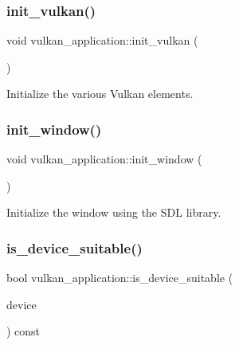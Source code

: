 \subsubsection{\texorpdfstring{init\+\_\+vulkan()}{init\_vulkan()}}
{\footnotesize\ttfamily void vulkan\+\_\+application\+::init\+\_\+vulkan (\begin{DoxyParamCaption}{ }\end{DoxyParamCaption})\hspace{0.3cm}{\ttfamily [private]}}



Initialize the various Vulkan elements. 

\mbox{\label{classvulkan__application_a6da121f1ee6104c981725c7c848c53a2}} 
\subsubsection{\texorpdfstring{init\+\_\+window()}{init\_window()}}
{\footnotesize\ttfamily void vulkan\+\_\+application\+::init\+\_\+window (\begin{DoxyParamCaption}{ }\end{DoxyParamCaption})\hspace{0.3cm}{\ttfamily [private]}}



Initialize the window using the S\+DL library. 

\mbox{\label{classvulkan__application_ae329db3c0937c649fa95b64250372a43}} 
\subsubsection{\texorpdfstring{is\+\_\+device\+\_\+suitable()}{is\_device\_suitable()}}
{\footnotesize\ttfamily bool vulkan\+\_\+application\+::is\+\_\+device\+\_\+suitable (\begin{DoxyParamCaption}\item[{const Vk\+Physical\+Device}]{device }\end{DoxyParamCaption}) const\hspace{0.3cm}{\ttfamily [private]}}




